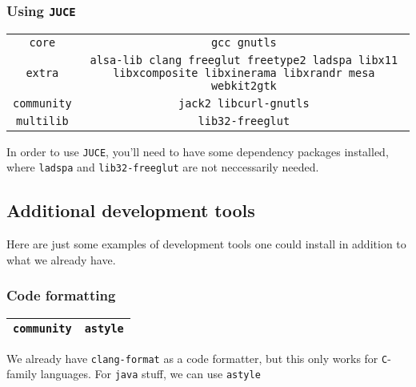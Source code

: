 \documentclass[9pt]{report}
\begin{document}
\vfill\eject

\hypertarget{x-using-juce}{\subsubsection{Using \texttt{JUCE}}}
\begin{center}
\begin{tabular}{|c|c|}
\hline
\texttt{core} & \texttt{gcc gnutls} \\ 
\texttt{extra} & \texttt{alsa-lib clang freeglut freetype2 ladspa libx11 libxcomposite libxinerama libxrandr mesa webkit2gtk} \\ 
\texttt{community} & \texttt{jack2 libcurl-gnutls} \\ 
\texttt{multilib} & \texttt{lib32-freeglut} \\ 
\hline
\end{tabular}
\end{center}

In order to use \texttt{JUCE}, you’ll need to have some dependency packages installed, where \texttt{ladspa} and \texttt{lib32-freeglut} are not neccessarily needed.



\vfill\eject

\hypertarget{x-additional-development-tools}{\subsection{Additional development tools}}
Here are just some examples of development tools one could install in addition to what we already have.



\vfill\eject

\hypertarget{x-code-formatting}{\subsubsection{Code formatting}}
\begin{center}
\begin{tabular}{|c|c|}
\hline
\texttt{community} & \texttt{astyle} \\ 
\hline
\end{tabular}
\end{center}

We already have \texttt{clang-format} as a code formatter, but this only works for \texttt{C}-family languages.
For \texttt{java} stuff, we can use \texttt{astyle}
\end{document}
